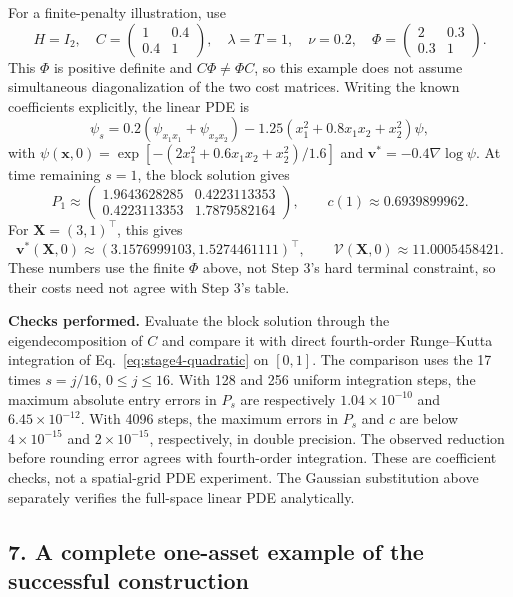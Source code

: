 \documentclass[11pt,a4paper]{article}
\begin{document}
For a finite-penalty illustration, use
\[
 H=I_2,\quad C=\begin{pmatrix}1&0.4\\0.4&1\end{pmatrix},\quad
 \lambda=T=1,\quad\nu=0.2,\quad
 \Phi=\begin{pmatrix}2&0.3\\0.3&1\end{pmatrix}.
\]
This $\Phi$ is positive definite and $C\Phi\ne\Phi C$, so this example
does not assume simultaneous diagonalization of the two cost matrices.
Writing the known coefficients explicitly, the linear PDE is
\begin{equation}
 \boxed{\psi_s=0.2(\psi_{x_1x_1}+\psi_{x_2x_2})
 -1.25(x_1^2+0.8x_1x_2+x_2^2)\psi,}
 \label{eq:stage4-twoasset}
\end{equation}
with
$\psi(\mathbf x,0)=\exp[-(2x_1^2+0.6x_1x_2+x_2^2)/1.6]$ and
$\mathbf v^*=-0.4\nabla\log\psi$.
At time remaining $s=1$, the block solution gives
\[
 P_1\approx\begin{pmatrix}
 1.9643628285&0.4223113353\\0.4223113353&1.7879582164
 \end{pmatrix},\qquad c(1)\approx0.6939899962.
\]
For $\mathbf X=(3,1)^\top$, this gives
\[
 \mathbf v^*(\mathbf X,0)\approx
 (3.1576999103,1.5274461111)^\top,\qquad
 \mathcal V(\mathbf X,0)\approx11.0005458421.
\]
These numbers use the finite $\Phi$ above, not Step 3's hard terminal
constraint, so their costs need not agree with Step 3's table.

\textbf{Checks performed.} Evaluate the block solution through the
eigendecomposition of $C$ and compare it with direct fourth-order
Runge--Kutta integration of Eq.~\eqref{eq:stage4-quadratic} on $[0,1]$.
The comparison uses the 17 times $s=j/16$, $0\le j\le16$.
With 128 and 256 uniform integration steps, the maximum absolute entry
errors in $P_s$ are respectively $1.04\times10^{-10}$ and
$6.45\times10^{-12}$. With 4096 steps, the maximum errors in $P_s$
and $c$ are below $4\times10^{-15}$ and $2\times10^{-15}$,
respectively, in double precision. The observed reduction before rounding
error agrees with fourth-order integration. These are coefficient checks,
not a spatial-grid PDE experiment. The Gaussian substitution above
separately verifies the full-space linear PDE analytically.

\subsection*{7. A complete one-asset example of the successful construction}
\end{document}
